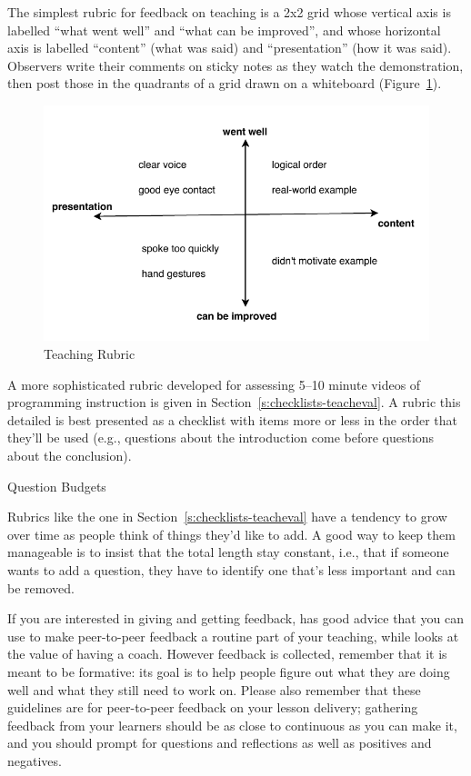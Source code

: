 The simplest rubric for feedback on teaching is a 2x2 grid whose
vertical axis is labelled ``what went well'' and ``what can be improved'',
and whose horizontal axis is labelled ``content'' (what was said) and
``presentation'' (how it was said). Observers write their comments on
sticky notes as they watch the demonstration, then post those in the
quadrants of a grid drawn on a whiteboard
(Figure~\ref{f:performance-rubric}).

\begin{figure}
\centering
\includegraphics{../../figures/2x2-rubric.pdf}
\caption{Teaching Rubric}
\label{f:performance-rubric}
\end{figure}

A more sophisticated rubric developed for assessing 5--10 minute videos
of programming instruction is given in Section~\ref{s:checklists-teacheval}. A
rubric this detailed is best presented as a checklist with items more or
less in the order that they'll be used (e.g., questions about the
introduction come before questions about the conclusion).

\begin{aside}{Question Budgets}

Rubrics like the one in Section~\ref{s:checklists-teacheval} have a tendency to
grow over time as people think of things they'd like to add. A good
way to keep them manageable is to insist that the total length stay
constant, i.e., that if someone wants to add a question, they have to
identify one that's less important and can be removed.

\end{aside}

If you are interested in giving and getting feedback, \cite{Gorm2014}
has good advice that you can use to make peer-to-peer feedback a routine
part of your teaching, while \cite{Gawa2011} looks at the value of
having a coach. However feedback is collected, remember that it is meant
to be formative: its goal is to help people figure out what they are
doing well and what they still need to work on. Please also remember
that these guidelines are for peer-to-peer feedback on your lesson
delivery; gathering feedback from your learners should be as close to
continuous as you can make it, and you should prompt for questions and
reflections as well as positives and negatives.

